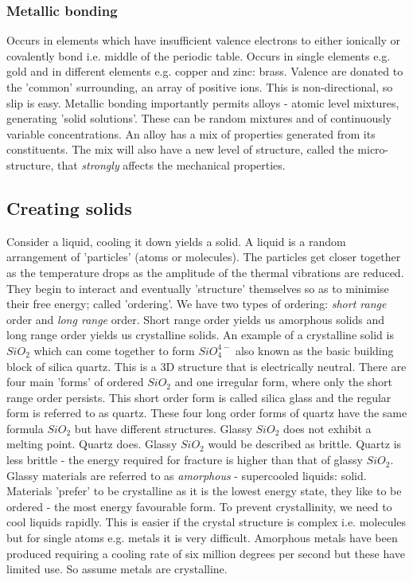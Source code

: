 \subsubsection{Metallic bonding}
Occurs in elements which have insufficient valence electrons to either ionically or covalently bond i.e. middle of the periodic table. Occurs in single elements e.g. gold and in different elements e.g. copper and zinc: brass. Valence are donated to the 'common' surrounding, an array of positive ions. This is non-directional, so slip is easy. Metallic bonding importantly permits alloys - atomic level mixtures, generating 'solid solutions'. These can be random mixtures and of continuously variable concentrations. An alloy has a mix of properties generated from its constituents. The mix will also have a new level of structure, called the micro-structure, that \emph{strongly} affects the mechanical properties.
\subsection{Creating solids}
Consider a liquid, cooling it down yields a solid. A liquid is a random arrangement of 'particles' (atoms or molecules). The particles get closer together as the temperature drops as the amplitude of the thermal vibrations are reduced. They begin to interact and eventually 'structure' themselves so as to minimise their free energy; called 'ordering'. We have two types of ordering: \emph{short range} order and \emph{long range} order. Short range order yields us amorphous solids and long range order yields us crystalline solids. An example of a crystalline solid is \(SiO_2\) which can come together to form \(SiO_4^{4-}\) also known as the basic building block of silica quartz. This is a 3D structure that is electrically neutral. There are four main 'forms' of ordered \(SiO_2\) and one irregular form, where only the short range order persists. This short order form is called silica glass and the regular form is referred to as quartz. These four long order forms of quartz have the same formula \(SiO_2\) but have different structures. Glassy \(SiO_2\) does not exhibit a melting point. Quartz does. Glassy \(SiO_2\) would be described as brittle. Quartz is less brittle - the energy required for fracture is higher than that of glassy \(SiO_2\). Glassy materials are referred to as \emph{amorphous} - supercooled liquids: solid. Materials 'prefer' to be crystalline as it is the lowest energy state, they like to be ordered - the most energy favourable form. To prevent crystallinity, we need to cool liquids rapidly. This is easier if the crystal structure is complex i.e. molecules but for single atoms e.g. metals it is very difficult. Amorphous metals have been produced requiring a cooling rate of six million degrees per second but these have limited use. So assume metals are crystalline.